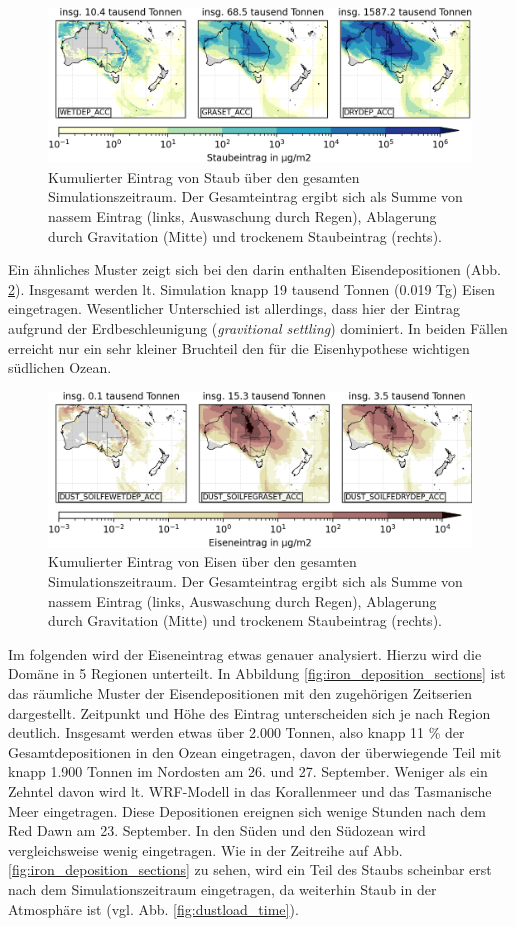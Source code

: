 \documentclass[12pt,a4paper,onecolumn]{scrartcl}
\begin{document}
\begin{figure}
\includegraphics[width=\textwidth]{bilder/dust_deposition_vars.png}
\caption{Kumulierter Eintrag von Staub über den gesamten Simulationszeitraum. Der Gesamteintrag ergibt sich als Summe von nassem Eintrag (links, Auswaschung durch Regen), Ablagerung durch Gravitation (Mitte) und trockenem Staubeintrag (rechts).} \label{fig:deposition}
\end{figure}
Ein ähnliches Muster zeigt sich bei den darin enthalten Eisendepositionen (Abb. \ref{fig:iron_deposition}). Insgesamt werden lt. Simulation knapp 19 tausend Tonnen (0.019 Tg) Eisen eingetragen. Wesentlicher Unterschied ist allerdings, dass hier der Eintrag aufgrund der Erdbeschleunigung (\textit{gravitional settling}) dominiert. In beiden Fällen erreicht nur ein sehr kleiner Bruchteil den für die Eisenhypothese wichtigen südlichen Ozean.
\begin{figure}
\includegraphics[width=\textwidth]{bilder/iron_deposition_vars.png}
\caption{Kumulierter Eintrag von Eisen über den gesamten Simulationszeitraum. Der Gesamteintrag ergibt sich als Summe von nassem Eintrag (links, Auswaschung durch Regen), Ablagerung durch Gravitation (Mitte) und trockenem Staubeintrag (rechts).} \label{fig:iron_deposition}
\end{figure}
Im folgenden wird der Eiseneintrag etwas genauer analysiert. Hierzu wird die Domäne in 5 Regionen unterteilt. In Abbildung \ref{fig:iron_deposition_sections} ist das räumliche Muster der Eisendepositionen mit den zugehörigen Zeitserien dargestellt. Zeitpunkt und Höhe des Eintrag unterscheiden sich je nach Region deutlich. Insgesamt werden etwas über 2.000 Tonnen, also knapp 11 \% der Gesamtdepositionen in den Ozean eingetragen, davon der überwiegende Teil mit knapp 1.900 Tonnen im Nordosten am 26. und 27. September. Weniger als ein Zehntel davon wird lt. WRF-Modell in das Korallenmeer und das Tasmanische Meer eingetragen. Diese Depositionen ereignen sich wenige Stunden nach dem Red Dawn am 23. September. In den Süden und den Südozean wird vergleichsweise wenig eingetragen. Wie in der Zeitreihe auf Abb. \ref{fig:iron_deposition_sections} zu sehen, wird ein Teil des Staubs scheinbar erst nach dem Simulationszeitraum eingetragen, da weiterhin Staub in der Atmosphäre ist (vgl. Abb. \ref{fig:dustload_time}).
\end{document}
